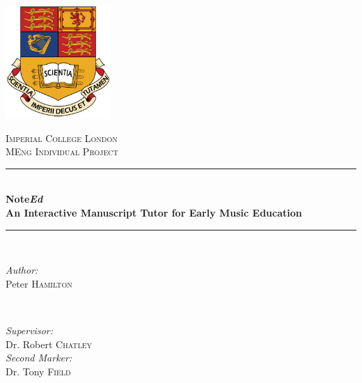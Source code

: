 
\begin{titlepage}

\newcommand{\HRule}{\rule{\linewidth}{0.5mm}} %

\begin{center} %


\includegraphics[width=0.3\textwidth]{gfx/icl-crest.jpg}

\textsc{\LARGE Imperial College London}\\[1.5cm] %
\textsc{\Large MEng Individual Project}\\[0.5cm] %


\HRule \\[0.4cm]
{ \Large \bfseries Note\emph{Ed}}\\[0.4cm]
{ \large \bfseries An Interactive Manuscript Tutor for Early Music Education }\\[0.3cm]
\HRule \\[1.5cm]


\begin{minipage}{0.4\textwidth}
\begin{flushleft} \large
\emph{Author:}\\
Peter \textsc{Hamilton}
\end{flushleft}
\end{minipage}
~
\begin{minipage}{0.4\textwidth}
\begin{flushright} \large
\emph{Supervisor:} \\
Dr. Robert \textsc{Chatley}
\\[0.5cm]
\emph{Second Marker:} \\
Dr. Tony \textsc{Field}
\end{flushright}
\end{minipage}\\[4cm]


\end{center}
\end{titlepage}

